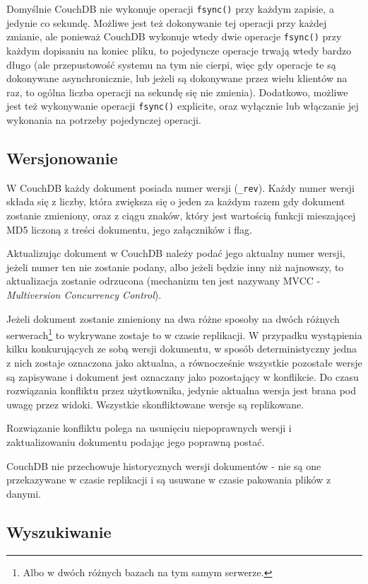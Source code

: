 Domyślnie CouchDB nie wykonuje operacji \verb+fsync()+ przy każdym zapisie, a jedynie co sekundę.
Możliwe jest też dokonywanie tej operacji przy każdej zmianie, ale ponieważ CouchDB wykonuje wtedy dwie operacje \verb+fsync()+ przy każdym dopisaniu na koniec pliku, to pojedyncze operacje trwają wtedy bardzo długo (ale przepustowość systemu na tym nie cierpi, więc gdy operacje te są dokonywane asynchronicznie, lub jeżeli są dokonywane przez wielu klientów na raz, to ogólna liczba operacji na sekundę się nie zmienia).
Dodatkowo, możliwe jest też wykonywanie operacji \verb+fsync()+ explicite, oraz wyłącznie lub włączanie jej wykonania na potrzeby pojedynczej operacji. 

\subsection*{Wersjonowanie}

W CouchDB każdy dokument posiada numer wersji (\verb+_rev+).
Każdy numer wersji składa się z liczby, która zwiększa się o jeden za każdym razem gdy dokument zostanie zmieniony, oraz z ciągu znaków, który jest wartością funkcji mieszającej MD5 liczoną z treści dokumentu, jego załączników i flag.

Aktualizując dokument w CouchDB należy podać jego aktualny numer wersji, jeżeli numer ten nie zostanie podany, albo jeżeli będzie inny niż najnowszy, to aktualizacja zostanie odrzucona (mechanizm ten jest nazywany MVCC - \emph{Multiversion Concurrency Control}).

Jeżeli dokument zostanie zmieniony na dwa różne sposoby na dwóch różnych serwerach\footnote{Albo w dwóch różnych bazach na tym samym serwerze.} to wykrywane zostaje to w czasie replikacji.
W przypadku wystąpienia kilku konkurujących ze sobą wersji dokumentu, w sposób deterministyczny jedna z nich zostaje oznaczona jako aktualna, a równocześnie wszystkie pozostałe wersje są zapisywane i dokument jest oznaczany jako pozostający w konflikcie.
Do czasu rozwiązania konfliktu przez użytkownika, jedynie aktualna wersja jest brana pod uwagę przez widoki.
Wszystkie skonfliktowane wersje są replikowane.

Rozwiązanie konfliktu polega na usunięciu niepoprawnych wersji i zaktualizowaniu dokumentu podając jego poprawną postać.

CouchDB nie przechowuje historycznych wersji dokumentów - nie są one przekazywane w czasie replikacji i są usuwane w czasie pakowania plików z danymi.

\subsection*{Wyszukiwanie}

